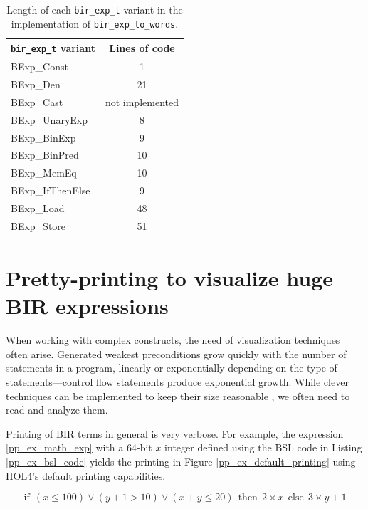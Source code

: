 \documentclass{kththesis}
\begin{document}
\begin{table}[ht!]
    \centering
    \begin{tabular}{ | l | c | }
        \hline
        \texttt{bir\_exp\_t} variant & Lines of code\\
        \hline
        BExp\_Const & 1\\
        BExp\_Den & 21\\
        BExp\_Cast & not implemented\\
        BExp\_UnaryExp & 8\\
        BExp\_BinExp & 9\\
        BExp\_BinPred & 10\\
        BExp\_MemEq & 10\\
        BExp\_IfThenElse & 9\\
        BExp\_Load & 48\\
        BExp\_Store & 51\\
        \hline
    \end{tabular}
    \caption{Length of each \texttt{bir\_exp\_t} variant in the implementation of \texttt{bir\_exp\_to\_words}.}
    \label{bir_exp_to_words_variants_loc}
\end{table}

\section{Pretty-printing to visualize huge BIR expressions}

When working with complex constructs, the need of visualization techniques often arise. Generated weakest preconditions grow quickly with the number of statements in a program, linearly or exponentially depending on the type of statements---control flow statements produce exponential growth. While clever techniques can be implemented to keep their size reasonable \cite{lindner_trabin:_2019}, we often need to read and analyze them.

Printing of BIR terms in general is very verbose. For example, the expression \ref{pp_ex_math_exp} with a 64-bit $x$ integer defined using the BSL code in Listing \ref{pp_ex_bsl_code} yields the printing in Figure \ref{pp_ex_default_printing} using HOL4's default printing capabilities.

\begin{equation}
    \text{if}~~(x \leq 100) \lor (y + 1 > 10) \lor (x + y \leq 20)~~\text{then}~~2 \times x~~\text{else}~~3 \times y + 1
    \label{pp_ex_math_exp}
\end{equation}
\end{document}
